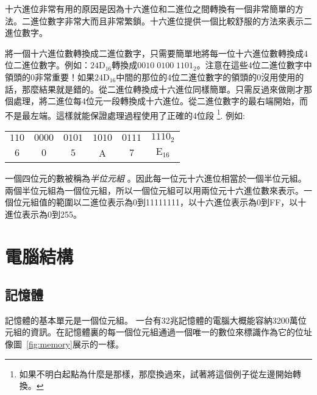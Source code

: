 十六進位非常有用的原因是因為十六進位和二進位之間轉換有一個非常簡單的方法。二進位數字非常大而且非常繁鎖。十六進位提供一個比較舒服的方法來表示二進位數字。

將一個十六進位數轉換成二進位數字，只需要簡單地將每一位十六進位數轉換成4位二進位數字。例如：$\mathrm{24D}_{16}$轉換成\mbox{$0010\;0100\;
1101_2$}。注意在這些4位二進位數字中領頭的0非常重要！如果$\mathrm{24D}_{16}$中間的那位的4位二進位數字的領頭的0沒用使用的話，那麼結果就是錯的。從二進位轉換成十六進位同樣簡單。只需反過來做剛才那個處理，將二進位每4位元一段轉換成十六進位。從二進位數字的最右端開始，而不是最左端。這樣就能保證處理過程使用了正確的4位段
\footnote{如果不明白起點為什麼是那樣，那麼換過來，試著將這個例子從左邊開始轉換。}.
例如:\newline

\begin{tabular}{cccccc}
$110$ & $0000$ & $0101$ & $1010$ & $0111$ & $1110_2$ \\
  $6$ & $0$    &   $5$  &   A  &  $7$   &    $\mathrm{E}_{16}$ \\
\end{tabular}\newline

一個四位元的數被稱為\emph{半位元組}
。因此每一位元十六進位相當於一個半位元組。兩個半位元組為一個位元組，所以一個位元組可以用兩位元十六進位數來表示。一個位元組值的範圍以二進位表示為0到11111111，以十六進位表示為0到FF，以十進位表示為0到255。

\section{電腦結構}

\subsection{記憶體}

記憶體的基本單元是一個位元組。
一台有32兆記憶體的電腦大概能容納3200萬位元組的資訊。在記憶體裏的每一個位元組通過一個唯一的數位來標識作為它的位址像圖~\ref{fig:memory}展示的一樣。


